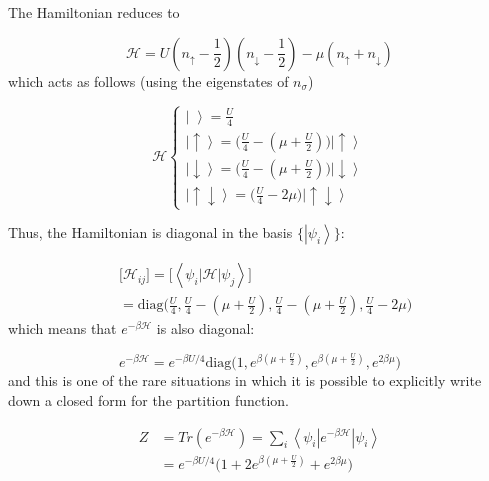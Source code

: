 \documentclass[10pt, twocolumn, twoside]{article}
\begin{document}
The Hamiltonian reduces to 

\begin{equation}
\mathcal{H} = U (n_\uparrow - \frac{1}{2} ) (n_\downarrow - \frac{1}{2} ) - \mu ( n_\uparrow + n_\downarrow )
\end{equation}
which acts as follows (using the eigenstates of $n_\sigma$)

\begin{equation}
\mathcal{H} \begin{cases}
\left| \,\, \right\rangle = \frac{U}{4} \\
\left| \uparrow \right\rangle = \bigg( \frac{U}{4} - (\mu + \frac{U}{2} ) \bigg) \left| \uparrow \right\rangle \\
\left| \downarrow \right\rangle = \bigg( \frac{U}{4} - (\mu + \frac{U}{2} ) \bigg) \left| \downarrow \right\rangle \\
\left| \uparrow \downarrow \right\rangle = \bigg( \frac{U}{4} - 2 \mu \bigg) \left| \uparrow \downarrow \right\rangle
\end{cases}
\end{equation}

Thus, the Hamiltonian is diagonal in the basis $\{\left| \psi_i \right\rangle \}$:

\begin{equation}
\begin{split}
&\bigg[ \mathcal{H}_{ij} \bigg] = \bigg[ \left\langle \psi_i \left| \mathcal{H} \right| \psi_j \right\rangle \bigg] \\
&= \text{diag}\bigg(\frac{U}{4}, \frac{U}{4} - (\mu + \frac{U}{2} ), \frac{U}{4} - (\mu + \frac{U}{2} ), \frac{U}{4} - 2 \mu \bigg)
\end{split}
\end{equation}
which means that $e^{-\beta \mathcal{H} }$ is also diagonal:

\begin{equation}
e^{-\beta \mathcal{H} } = e^{-\beta U / 4}  \text{diag}\bigg(1,  e^{\beta(\mu + \frac{U}{2})}, e^{\beta(\mu + \frac{U}{2})},  e^{2\beta \mu} \bigg)
\end{equation}
and this is one of the rare situations in which it is possible to explicitly write down a closed form for the partition function.

\begin{equation}
\begin{split}
Z &= Tr ( e^{-\beta\mathcal{H} } ) = \sum_i \left\langle \psi_i \left|e^{-\beta \mathcal{H} } \right| \psi_i \right\rangle \\
&= e^{-\beta U / 4} \bigg(1 + 2 e^{\beta(\mu + \frac{U}{2})} + e^{2 \beta \mu} \bigg)
\end{split}
\end{equation}
\end{document}
